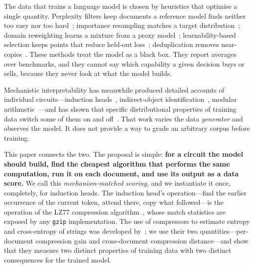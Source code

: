 \documentclass[11pt]{article}
\begin{document}
The data that trains a language model is chosen by heuristics that
optimise a single quantity. Perplexity filters keep documents a reference
model finds neither too easy nor too hard~\citep{wenzek2020ccnet};
importance resampling matches a target
distribution~\citep{xie2023dsir}; domain reweighting learns a mixture from
a proxy model~\citep{xie2023doremi}; learnability-based selection keeps
points that reduce held-out loss~\citep{mindermann2022rho}; deduplication
removes near-copies~\citep{lee2022dedup,abbas2023semdedup,tirumala2023d4}.
These methods treat the model as a black box. They report averages over
benchmarks, and they cannot say which capability a given decision buys or
sells, because they never look at what the model builds.

Mechanistic interpretability has meanwhile produced detailed accounts of
individual circuits---induction heads~\citep{olsson2022induction},
indirect-object identification~\citep{wang2022ioi}, modular
arithmetic~\citep{nanda2023grokking}---and has shown that specific
distributional properties of training data switch some of them on and
off~\citep{chan2022data,reddy2023mechanistic}. That work varies the data
\emph{generator} and observes the model. It does not provide a way to grade
an arbitrary corpus before training.

This paper connects the two. The proposal is simple: \textbf{for a circuit
the model should build, find the cheapest algorithm that performs the same
computation, run it on each document, and use its output as a data score.}
We call this \emph{mechanism-matched scoring}, and we instantiate it once,
completely, for induction heads. The induction head's operation---find the
earlier occurrence of the current token, attend there, copy what
followed---is the operation of the LZ77 compression
algorithm~\citep{ziv1977lz77}, whose match statistics are exposed by any
\texttt{gzip} implementation. The use of compressors to estimate entropy and
cross-entropy of strings was developed
by~\citet{benedetto2002language,baronchelli2005zippers}; we use their two
quantities---per-document compression gain and cross-document compression
distance---and show that they measure two distinct properties of training
data with two distinct consequences for the trained model.
\end{document}
